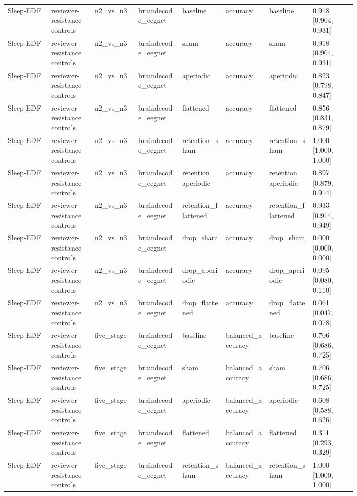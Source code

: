 \begin{longtable}{p{0.10\linewidth}p{0.10\linewidth}p{0.10\linewidth}p{0.10\linewidth}p{0.10\linewidth}p{0.10\linewidth}p{0.10\linewidth}p{0.10\linewidth}}
Sleep-EDF & reviewer-resistance controls & n2\_vs\_n3 & braindecode\_eegnet & baseline & accuracy & baseline & 0.918 [0.904, 0.931]\\
Sleep-EDF & reviewer-resistance controls & n2\_vs\_n3 & braindecode\_eegnet & sham & accuracy & sham & 0.918 [0.904, 0.931]\\
Sleep-EDF & reviewer-resistance controls & n2\_vs\_n3 & braindecode\_eegnet & aperiodic & accuracy & aperiodic & 0.823 [0.798, 0.847]\\
Sleep-EDF & reviewer-resistance controls & n2\_vs\_n3 & braindecode\_eegnet & flattened & accuracy & flattened & 0.856 [0.831, 0.879]\\
Sleep-EDF & reviewer-resistance controls & n2\_vs\_n3 & braindecode\_eegnet & retention\_sham & accuracy & retention\_sham & 1.000 [1.000, 1.000]\\
Sleep-EDF & reviewer-resistance controls & n2\_vs\_n3 & braindecode\_eegnet & retention\_aperiodic & accuracy & retention\_aperiodic & 0.897 [0.879, 0.914]\\
Sleep-EDF & reviewer-resistance controls & n2\_vs\_n3 & braindecode\_eegnet & retention\_flattened & accuracy & retention\_flattened & 0.933 [0.914, 0.949]\\
Sleep-EDF & reviewer-resistance controls & n2\_vs\_n3 & braindecode\_eegnet & drop\_sham & accuracy & drop\_sham & 0.000 [0.000, 0.000]\\
Sleep-EDF & reviewer-resistance controls & n2\_vs\_n3 & braindecode\_eegnet & drop\_aperiodic & accuracy & drop\_aperiodic & 0.095 [0.080, 0.110]\\
Sleep-EDF & reviewer-resistance controls & n2\_vs\_n3 & braindecode\_eegnet & drop\_flattened & accuracy & drop\_flattened & 0.061 [0.047, 0.078]\\
Sleep-EDF & reviewer-resistance controls & five\_stage & braindecode\_eegnet & baseline & balanced\_accuracy & baseline & 0.706 [0.686, 0.725]\\
Sleep-EDF & reviewer-resistance controls & five\_stage & braindecode\_eegnet & sham & balanced\_accuracy & sham & 0.706 [0.686, 0.725]\\
Sleep-EDF & reviewer-resistance controls & five\_stage & braindecode\_eegnet & aperiodic & balanced\_accuracy & aperiodic & 0.608 [0.588, 0.626]\\
Sleep-EDF & reviewer-resistance controls & five\_stage & braindecode\_eegnet & flattened & balanced\_accuracy & flattened & 0.311 [0.293, 0.329]\\
Sleep-EDF & reviewer-resistance controls & five\_stage & braindecode\_eegnet & retention\_sham & balanced\_accuracy & retention\_sham & 1.000 [1.000, 1.000]\\

\end{longtable}
